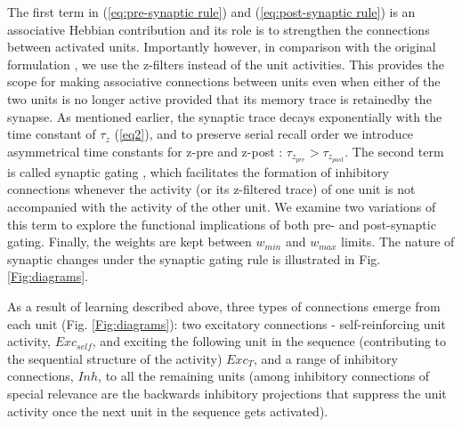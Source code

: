 \documentclass{esannV2}
\begin{document}
The first term in (\ref{eq:pre-synaptic rule}) and (\ref{eq:post-synaptic rule}) is an associative Hebbian contribution \cite{hebb2005organization} and its role is to strengthen the connections between activated units. Importantly however, in comparison with the original formulation \cite{andrew2003spiking}, we use the z-filters instead of the unit activities. This provides the scope for making associative connections between units even when either of the two units is no longer active provided that its memory trace is retainedby the synapse. As mentioned earlier, the synaptic trace decays exponentially with the time constant of $\tau_z$ (\ref{eq2}), and to preserve serial recall order we introduce asymmetrical time constants for z-pre and z-post : $\tau_{z_{pre}} > \tau_{z_{post}}$. The second term is called synaptic gating \cite{andrew2003spiking}, which facilitates the formation of inhibitory connections whenever the activity (or its z-filtered trace) of one unit is not accompanied with the activity of the other unit. We examine two variations of this term to explore the functional implications of both pre- and post-synaptic gating. Finally, the weights are kept between $w_{min}$ and $w_{max}$ limits. The nature of synaptic changes under the synaptic gating rule is illustrated in Fig. \ref{Fig:diagrams}.

%
As a result of learning described above, three types of connections emerge from each unit (Fig. \ref{Fig:diagrams}): two excitatory connections - self-reinforcing unit activity, $Exc_{self}$, and exciting the following unit in the sequence (contributing to the sequential structure of the activity) $Exc_T$, and a range of inhibitory connections, $Inh$, to all the remaining units (among inhibitory connections of special relevance are the backwards inhibitory projections that suppress the unit activity once the next unit in the sequence gets activated).
\end{document}
